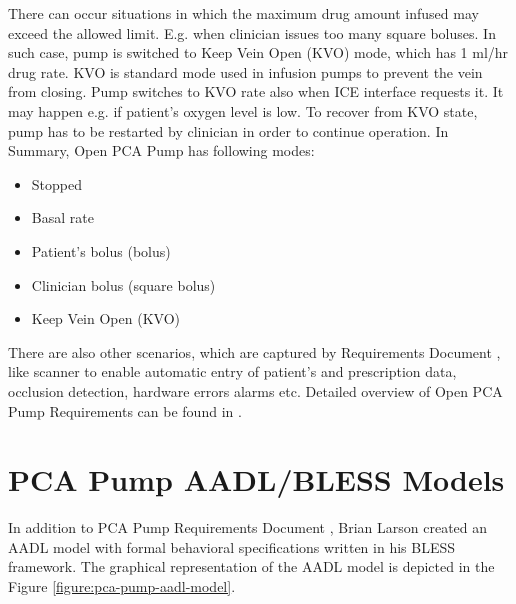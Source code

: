 There can occur situations in which the maximum drug amount infused may exceed the allowed limit. E.g. when clinician issues too many square boluses. In such case, pump is switched to Keep Vein Open (KVO) mode, which has 1 ml/hr drug rate. KVO is standard mode used in infusion pumps to prevent the vein from closing. Pump switches to KVO rate also when ICE interface requests it. It may happen e.g. if patient's oxygen level is low. To recover from KVO state, pump has to be restarted by clinician in order to continue operation. In Summary, Open PCA Pump has following modes:
\begin{itemize}
    \item Stopped
    \item Basal rate
    \item Patient's bolus (bolus)
    \item Clinician bolus (square bolus)
    \item Keep Vein Open (KVO)
\end{itemize}

There are also other scenarios, which are captured by Requirements Document \cite{PcaReq}, like scanner to enable automatic entry of patient's and prescription data, occlusion detection, hardware errors alarms etc. Detailed overview of Open PCA Pump Requirements can be found in \cite{PcaReq}.



\section{PCA Pump AADL/BLESS Models}
\label{pcapump:aadl-bless-models}

In addition to PCA Pump Requirements Document \cite{PcaReq}, Brian Larson created an AADL model with formal behavioral specifications written in his BLESS framework. The graphical representation of the AADL model is depicted in the Figure \ref{figure:pca-pump-aadl-model}. 

